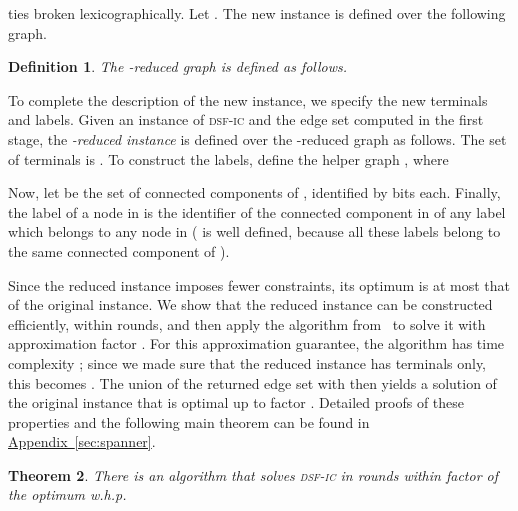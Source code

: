 \documentclass[letterpaper,11pt]{article}
\newtheorem{theorem}{Theorem}[section]
\newtheorem{definition}[theorem]{Definition}
\newcommand{\namedref}[2]{\hyperref[#2]{#1~\ref*{#2}}}
\newcommand{\appendixref}[1]{\namedref{Appendix}{#1}}
\newcommand{\sfic}{\textsc{dsf-ic}\xspace}
\begin{document}
 ties  broken lexicographically. Let . 
The new instance is defined over the following graph.

\begin{definition}The
  \emph{-reduced graph}   is
  defined as
  follows. 
  \begin{compactitem}
  \item 
  \item 
  \item 
  \end{compactitem}
\end{definition}

To complete the description of the new instance, we specify the new terminals
and labels.
Given an instance of \sfic and the edge set  computed in the first
stage, the \emph{-reduced instance} is defined over the 
-reduced graph  as follows. The set of terminals is 
. To
construct the labels, define the helper graph ,
where 
  
Now, let
 be the set of connected components of
, identified by   bits
each. Finally, the
label  of a node  in  is the identifier of the
connected component in  of any label 
which belongs to any node in  ( is well defined,
because all these labels belong to the same connected component of
). 

Since the reduced instance imposes fewer constraints, its optimum is at most
that of the original instance. We show that the reduced instance can be
constructed efficiently, within  rounds, and then apply the
algorithm from~\cite{LenzenP13} to solve it with approximation factor . For this approximation guarantee, the algorithm has time complexity
; since we made sure that the reduced instance has
 terminals only, this becomes .
The union of the returned edge set with  then yields a solution of the
original instance that is optimal up to factor . Detailed proofs of
these properties and the following main theorem can be found in
\appendixref{sec:spanner}.
\begin{theorem}\label{theorem:fast}
There is an algorithm that solves \sfic in 
rounds within factor  of the optimum w.h.p.
\end{theorem}

\newpage
\end{document}
